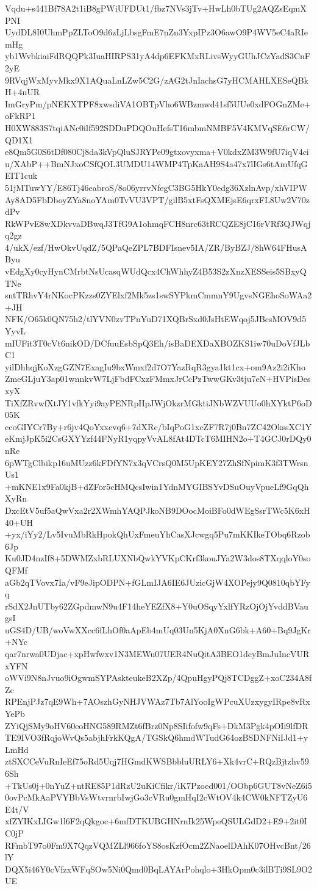 Vqdu+s441Bf78A2t1iB8gPWiUFDUt1/fbz7NVs3jTv+HwLh0bTUg2AQZsEqmXPNI
UydDL8I0UhmPpZLToO9d6zLjLbsgFmE7nZn3YxpIPz3O6awO9P4WV5eC4aRIemHg
yb1WvbkiaiFdRQQPk3IuaHIRPS31yA4dp6EFKMxRLivsWyyGUhJCzYadS3CnF2yE
9RVqjWxMyvMkx9X1AQuaLnLZw5C2G/zAG2tJnIachsG7yHCMAHLXESeQBkH+4nUR
ImGryPm/pNEKXTPF8xwsdiVA1OBTpVho6WBzmwd41sf5UUe0xdFOGnZMe+oFkRP1
H0XW883S7tqiANc0ilf592SDDuPDQOnHefsT16mbmNMBF5V4KMVqSE6rCW/QD1X1
e8Qm5G0S6tDf080Cj8da3kVpQluSJRYPe09gtxovyxma+V0kdxZM3W9fU7iqV4ci
u/XAbP++BmNJxoCSfQOL3UMDU14WMP4TpKaAH9S4a47x7lIGs6tAmUfqGEIT1cuk
51jMTuwYY/E86Tj46eabroS/8o06yrrvNfegC3BG5HkY0edg36XzlnAvp/xhVIPW
Ay8AD5FbDboyZYa8noYAm0TvVU3VPT/gilB5xtFsQXMEjsE6qrxFL8Uw2V70zdPv
RkWPvE8wXDkvvaDBwqJ3TfG9A1ohmqFCH8nrc63tRCQZE8jC16rVRf3QJWqjq2gz
4/ukX/ezf/HwOkvUqdZ/5QPaQeZPL7BDFIsnev5IA/ZR/ByBZJ/8hW64FHusAByu
vEdgXy0cyHynCMrbtNsUcasqWUdQcx4ChWhhyZ4B53S2zXnzXESSeis5SBxyQTNe
sntTRhvY4rNKocPKzzs0ZYElxf2Mk5zs1swSYPkmCmmnY9UgvsNGEhoSoWAa2+JH
NFK/O65k0QN75h2/tlYVN0zvTPnYuD71XQBrSxd0JsHtEWqoj5JBcsMOV9d5YyvL
mIUFit3T0cVt6nikOD/DCfuuEsbSpQ3Eh/isBaDEXDaXBOZKS1iw70uDoVfJLbC1
yilDhhqjKoXzgGZN7ExagIu9bxWmxf2d7O7YazRqR3gya1kt1cx+om9Az2i2iKho
ZmeGLjuY3ap01wnnkvW7LjFbdFCxzFMmxJrCcPzTwwGKv3tju7eN+HVPisDesxyX
TiXfZRvwfXtJY1vfkYyi9ayPENRpHpJWjOkzrMGktiJNbWZVUUo0hXYktP6oD05K
ccoGIYCr7By+r6jv4QoYxxcvq6+7dXRc/bIqPoG1xcZF7R7j0Bn7ZC42OkssXC1Y
eKmjJpK5i2CsGXYYzf44FNyR1yqpyVvAL8fAt4DTcT6MIHN2o+T4GCJ0rDQy0nRe
6pWTgClbikp16uMUzz6kFDfYN7x3qVCrsQ0M5UpKEY27ZhSfNpimK3f3TWrsnUs1
+mKNE1x9Fa0kjB+dZFor5cHMQcsIwin1YdnMYGIBSYvDSuOuyVpueLf9GqQhXyRn
DxcEtV5uf5aQwVxa2r2XWmhYAQPJkoNB9DOocMoiBFo0dWEgSsrTWc5K6xH40+UH
+yx/iYy2/Lv5IvuMbRkHpokQhUxFmeuYhCasXJcwgq5Pu7mKKIkeTObq6Rzob6Jp
Ku0JD4nzIf8+5DWMZxbRLUXNbQwkYVKpCKrf3kouJYa2W3dos8TXqqloY0soQFMf
aGb2qTVovx7Ia/vF9eJipODPN+fGLmIJA6IE6JUzicGjW4XOPejy9Q0810qbYFyq
rSdX2JnUTby62ZGpdmwN9u4F14heYEZfX8+Y0uOSqyYxlfYRzOjOjYvddBVaugsI
uGS4D/UB/woVwXXcc6fLhOf0aApEb4mUq03Un5KjA0XnG6bk+A60+Bq9JgKr+NYc
qar7nrwa0UDjac+xpHwfwxv1N3MEWu07UER4NuQitA3BEO1dcyBmJuIncVURxYFN
oWVi9N8nJvuo9iOgwmSYPAskteukeB2XZp/4QpuHgyPQj8TCDggZ+xoC234A8fZc
RPEnjPJz7qE9Wh+7AOszhGyNHJVWAz7Tb7AlYooIgWPcuXUzxygyIRpe8vRxYePb
ZYiQjSMy9oHV60eoHNG589RMZt6fBrz0Np8SIifofw9qFs+DkM3Pgk4pOIi9lfDR
TE9IVO3fRqjoWvQs5abjhFrkKQgA/TGSkQ6hmdWTudG64ozBSDNFNiIJd1+yLmHd
ztSXCCeVuRnIeEf75oRd5Uqj7HGmdKWSBbbluURLY6+Xk4vrC+RQzBjtzhv596Sh
+TkUs0j+0nYuZ+ntRE85P1dRzU2uKiCfikr/iK7Pzoed001/OObp6GUT8vNeZ6i5
0ovPcMkAaPVYBbVsWtvrnrbIwjGo3cVRu0gmHqI2cWtOV4k4CW0kNFTZyU6E4t/V
xfZYIKxLIGw1l6F2qQkgoc+6mfDTKUBGHNrnIk25WpeQSULGdD2+E9+2it0IC0jP
RFmbT97o0Fm9X7QqzVQMZLl966foYS8osKzfOcm2ZNaoelDAhK07OHvcBnt/26lY
DQX5i46Y0cVfzxWFqSOw5Ni0Qmd0BqLAYArPohqlo+3HkOpm0c3ilBTi9SL9O2UE
